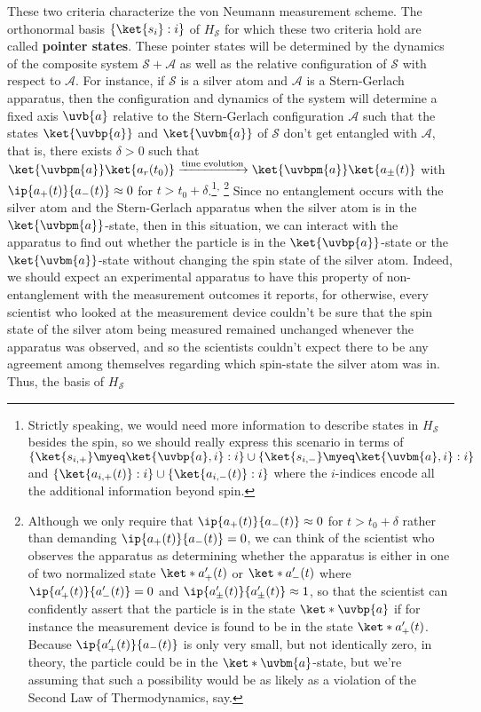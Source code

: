     These two criteria characterize the von Neumann measurement scheme. The orthonormal basis $\{\ket{s_i}:i\}$ of $H_\mathcal{S}$ for which these two criteria hold are called \textbf{pointer states\label{pointer}}. These pointer states will be determined by the  dynamics of the composite system $\mathcal{S}+\mathcal{A}$ as well as the relative configuration of $\mathcal{S}$ with respect to $\mathcal{A}$. For instance, if $\mathcal{S}$ is a silver atom and $\mathcal{A}$ is a Stern-Gerlach apparatus, then the configuration and dynamics of the system will determine a fixed axis $\uvb{a}$ relative to the Stern-Gerlach configuration $\mathcal{A}$ such that the states $\ket{\uvbp{a}}$ and $\ket{\uvbm{a}}$ of $\mathcal{S}$ don't get entangled with $\mathcal{A}$, that is, there exists $\delta>0$ such that $\ket{\uvbpm{a}}\ket{a_r(t_0)}\xrightarrow{\text{time evolution}}\ket{\uvbpm{a}}\ket{a_\pm(t)}$ with $\ip{a_+(t)}{a_-(t)}\approx 0$ for $t> t_0+\delta$.\footnote{%
    Strictly speaking, we would  need more information to describe states in $H_\mathcal{S}$ besides the spin, so we should really express this scenario in terms of $\{\ket{s_{i,+}}\myeq \ket{\uvbp{a},i}:i\}\cup \{\ket{s_{i,-}}\myeq \ket{\uvbm{a},i}:i\}$ and  $\{\ket{a_{i,+}(t)}:i\}\cup\{\ket{a_{i,-}(t)}:i\}$ where the $i$-indices encode all the additional information beyond spin.
    }\textsuperscript{, }\footnote{\label{nearzero}Although 
    we only require that  $\ip{a_+(t)}{a_-(t)}\approx 0$ for $t> t_0+\delta$ rather than demanding $\ip{a_+(t)}{a_-(t)} = 0$, we can think of the scientist who observes the apparatus as determining whether the apparatus is either in one of two normalized state $\ket*{a_+'(t)}$ or $\ket*{a_-'(t)}$ where 
    $\ip{a_+'(t)}{a_-'(t)} = 0$ 
    and $\ip{a_\pm'(t)}{a_\pm'(t)}\approx 1$, so that the scientist can confidently assert that the particle is in the state $\ket*{\uvbp{a}}$ if for instance the measurement device is found to be in the state $\ket*{a_+'(t)}$. Because $\ip{a_+'(t)}{a_-(t)}$ is only very small, but not identically zero, in theory, the particle could be in the $\ket*{\uvbm{a}}$-state, but we're assuming that such a possibility would be as likely as a violation of the Second Law of Thermodynamics, say.}
    Since no entanglement occurs with the silver atom and the Stern-Gerlach apparatus when the silver atom is in the $\ket{\uvbpm{a}}$-state, then in this situation, we can interact with the apparatus to find out whether the particle is in the $\ket{\uvbp{a}}$-state or the $\ket{\uvbm{a}}$-state without changing the spin state of the silver atom. Indeed, we should expect an experimental apparatus to have this property of non-entanglement with the measurement outcomes it reports, for otherwise, every scientist who looked at the measurement device couldn't be sure that the spin state of the silver atom being measured remained unchanged whenever the apparatus was observed, and so the scientists couldn't expect there to be any agreement among themselves  regarding which spin-state the silver atom was in. Thus, the basis of $H_\mathcal{S}$ 

